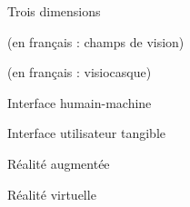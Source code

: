 \item [3D] Trois dimensions
\item [CAVE] 
\item [FOV]  (en français : champs de vision)
\item [GUI] 
\item [HMD]  (en français : visiocasque)
\item [IHM] Interface humain-machine
\item [IUT] Interface utilisateur tangible
\item [RA] Réalité augmentée
\item [RV] Réalité virtuelle